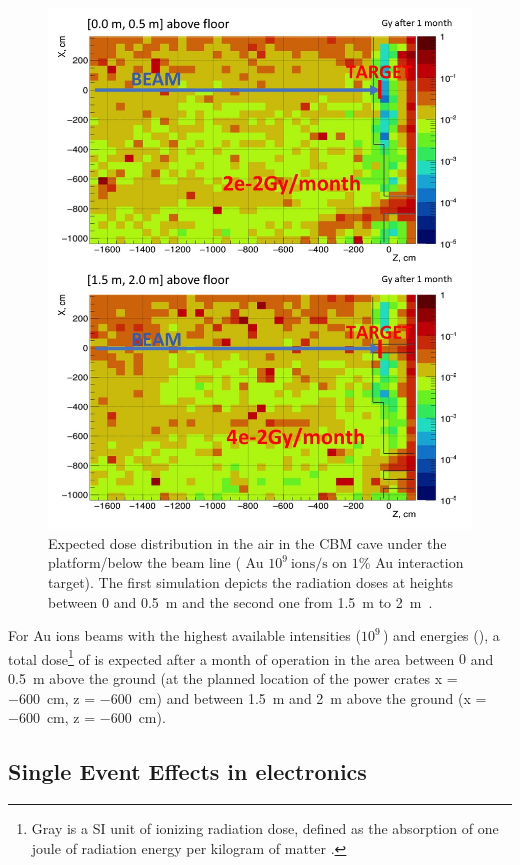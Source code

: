 \begin{figure}[!h]
    \centering
    \includegraphics[width=0.7\columnwidth]{Chapter4/images/Dose00.jpg}
    \caption{Expected dose distribution in the air in the \gls{CBM}
cave under the platform/below the beam line  ( Au $10^{9} \mathrm{\ ions/s}$ on $1$\% Au
interaction target). The first simulation depicts the radiation doses at heights between 0 and \SI{0.5}{\metre} and the second one from \SI{1.5}{\metre} to \SI{2}{\metre}~\cite{fluka_senger}.} 
    \label{fig:mCBM}
\end{figure}
For Au ions beams with the highest available intensities 
($10^{9}\,$\ionss) and energies 
(), a total dose\footnote{Gray is a SI unit of ionizing radiation dose, defined as the absorption of one joule of radiation energy per kilogram of matter \cite{gray}.} of  is expected after a month of operation in the area between $0$ and \SI{0.5}{\metre} above the ground (at the planned location of the power crates x = \SI{-600}{\centi\metre}, z = \SI{-600}{\centi\metre}) and  between \SI{1.5}{\metre} and \SI{2}{\metre} above the ground (x = \SI{-600}{\centi\metre}, z = \SI{-600}{\centi\metre}).
 

\newpage
\subsection{Single Event Effects in electronics}

